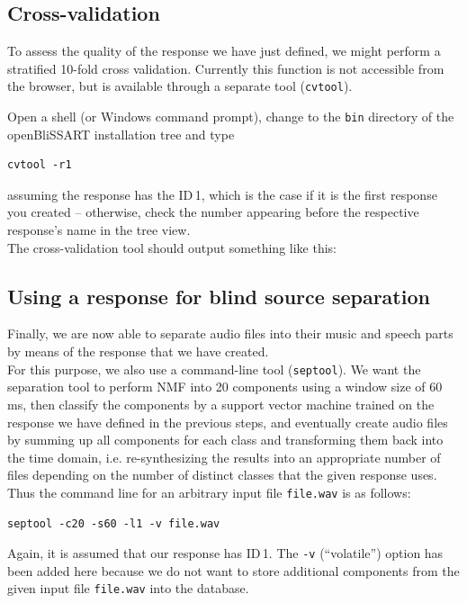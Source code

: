 \subsection{Cross-validation}

To assess the quality of the response we have just defined, we might perform a
stratified 10-fold cross validation. Currently this function is not accessible
from the browser, but is available through a separate tool ({\tt cvtool}).

Open a shell (or Windows command prompt), change to the {\tt bin} directory of
the openBliSSART installation tree and type

\begin{verbatim}
cvtool -r1
\end{verbatim}

assuming the response has the ID\,1, which is the case if it is the first
response you created -- otherwise, check the number appearing before the
respective response's name in the tree view.\\
The cross-validation tool should output something like this:




\subsection{Using a response for blind source separation}

Finally, we are now able to separate audio files into their music and speech
parts by means of the response that we have created.\\

For this purpose, we also use a command-line tool ({\tt septool}). We want the
separation tool to perform NMF into 20 components using a window size of 60\,ms,
then classify the components by a support vector machine trained on the response
we have defined in the previous steps, and eventually create audio files by
summing up all components for each class and transforming them back into the
time domain, i.e. re-synthesizing the results into an appropriate number of
files depending on the number of distinct classes that the given response
uses. Thus the command line for an arbitrary input file \verb|file.wav| is as
follows:

\begin{verbatim}
septool -c20 -s60 -l1 -v file.wav
\end{verbatim}

Again, it is assumed that our response has ID\,1. The {\tt -v} (``volatile'')
option has been added here because we do not want to store additional components
from the given input file \verb|file.wav| into the database.\\

